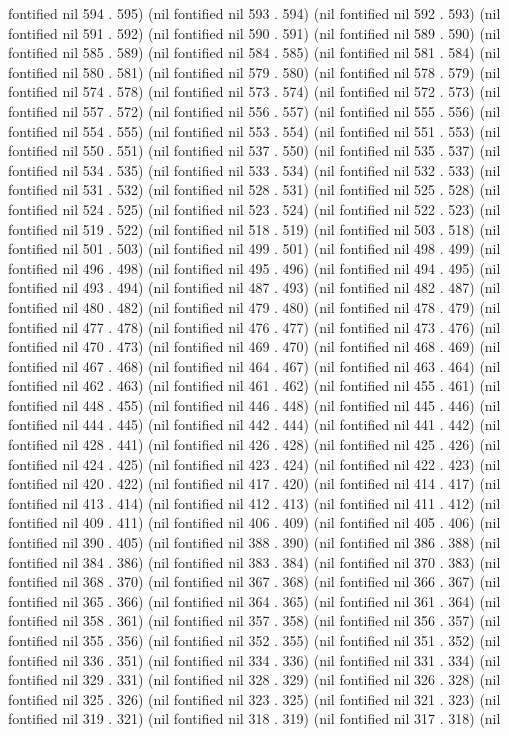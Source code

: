 fontified nil 594 . 595) (nil fontified nil 593 . 594) (nil fontified nil 592 . 593) (nil fontified nil 591 . 592) (nil fontified nil 590 . 591) (nil fontified nil 589 . 590) (nil fontified nil 585 . 589) (nil fontified nil 584 . 585) (nil fontified nil 581 . 584) (nil fontified nil 580 . 581) (nil fontified nil 579 . 580) (nil fontified nil 578 . 579) (nil fontified nil 574 . 578) (nil fontified nil 573 . 574) (nil fontified nil 572 . 573) (nil fontified nil 557 . 572) (nil fontified nil 556 . 557) (nil fontified nil 555 . 556) (nil fontified nil 554 . 555) (nil fontified nil 553 . 554) (nil fontified nil 551 . 553) (nil fontified nil 550 . 551) (nil fontified nil 537 . 550) (nil fontified nil 535 . 537) (nil fontified nil 534 . 535) (nil fontified nil 533 . 534) (nil fontified nil 532 . 533) (nil fontified nil 531 . 532) (nil fontified nil 528 . 531) (nil fontified nil 525 . 528) (nil fontified nil 524 . 525) (nil fontified nil 523 . 524) (nil fontified nil 522 . 523) (nil fontified nil 519 . 522) (nil fontified nil 518 . 519) (nil fontified nil 503 . 518) (nil fontified nil 501 . 503) (nil fontified nil 499 . 501) (nil fontified nil 498 . 499) (nil fontified nil 496 . 498) (nil fontified nil 495 . 496) (nil fontified nil 494 . 495) (nil fontified nil 493 . 494) (nil fontified nil 487 . 493) (nil fontified nil 482 . 487) (nil fontified nil 480 . 482) (nil fontified nil 479 . 480) (nil fontified nil 478 . 479) (nil fontified nil 477 . 478) (nil fontified nil 476 . 477) (nil fontified nil 473 . 476) (nil fontified nil 470 . 473) (nil fontified nil 469 . 470) (nil fontified nil 468 . 469) (nil fontified nil 467 . 468) (nil fontified nil 464 . 467) (nil fontified nil 463 . 464) (nil fontified nil 462 . 463) (nil fontified nil 461 . 462) (nil fontified nil 455 . 461) (nil fontified nil 448 . 455) (nil fontified nil 446 . 448) (nil fontified nil 445 . 446) (nil fontified nil 444 . 445) (nil fontified nil 442 . 444) (nil fontified nil 441 . 442) (nil fontified nil 428 . 441) (nil fontified nil 426 . 428) (nil fontified nil 425 . 426) (nil fontified nil 424 . 425) (nil fontified nil 423 . 424) (nil fontified nil 422 . 423) (nil fontified nil 420 . 422) (nil fontified nil 417 . 420) (nil fontified nil 414 . 417) (nil fontified nil 413 . 414) (nil fontified nil 412 . 413) (nil fontified nil 411 . 412) (nil fontified nil 409 . 411) (nil fontified nil 406 . 409) (nil fontified nil 405 . 406) (nil fontified nil 390 . 405) (nil fontified nil 388 . 390) (nil fontified nil 386 . 388) (nil fontified nil 384 . 386) (nil fontified nil 383 . 384) (nil fontified nil 370 . 383) (nil fontified nil 368 . 370) (nil fontified nil 367 . 368) (nil fontified nil 366 . 367) (nil fontified nil 365 . 366) (nil fontified nil 364 . 365) (nil fontified nil 361 . 364) (nil fontified nil 358 . 361) (nil fontified nil 357 . 358) (nil fontified nil 356 . 357) (nil fontified nil 355 . 356) (nil fontified nil 352 . 355) (nil fontified nil 351 . 352) (nil fontified nil 336 . 351) (nil fontified nil 334 . 336) (nil fontified nil 331 . 334) (nil fontified nil 329 . 331) (nil fontified nil 328 . 329) (nil fontified nil 326 . 328) (nil fontified nil 325 . 326) (nil fontified nil 323 . 325) (nil fontified nil 321 . 323) (nil fontified nil 319 . 321) (nil fontified nil 318 . 319) (nil fontified nil 317 . 318) (nil 